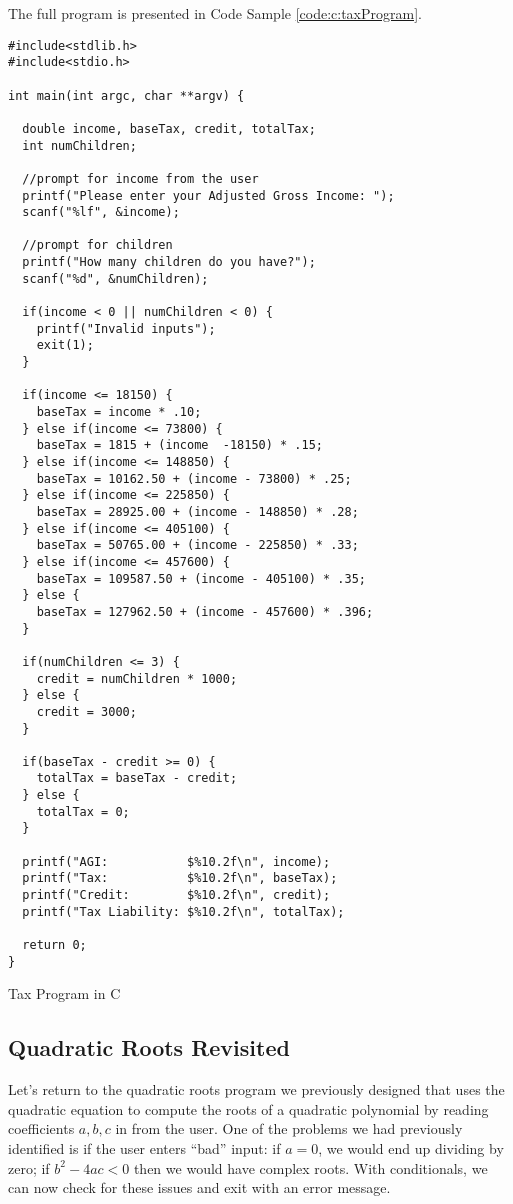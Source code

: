 The full program is presented in Code Sample \ref{code:c:taxProgram}.

\begin{listing}[h]
\begin{verbatim}
#include<stdlib.h>
#include<stdio.h>

int main(int argc, char **argv) {

  double income, baseTax, credit, totalTax;
  int numChildren;

  //prompt for income from the user
  printf("Please enter your Adjusted Gross Income: ");
  scanf("%lf", &income);

  //prompt for children
  printf("How many children do you have?");
  scanf("%d", &numChildren);

  if(income < 0 || numChildren < 0) {
    printf("Invalid inputs");
    exit(1);
  }

  if(income <= 18150) {
    baseTax = income * .10;
  } else if(income <= 73800) {
    baseTax = 1815 + (income  -18150) * .15;
  } else if(income <= 148850) {
    baseTax = 10162.50 + (income - 73800) * .25;
  } else if(income <= 225850) {
    baseTax = 28925.00 + (income - 148850) * .28;
  } else if(income <= 405100) {
    baseTax = 50765.00 + (income - 225850) * .33;
  } else if(income <= 457600) {
    baseTax = 109587.50 + (income - 405100) * .35;
  } else {
    baseTax = 127962.50 + (income - 457600) * .396;
  }

  if(numChildren <= 3) {
    credit = numChildren * 1000;
  } else {
    credit = 3000;
  }

  if(baseTax - credit >= 0) {
    totalTax = baseTax - credit;
  } else {
    totalTax = 0;
  }

  printf("AGI:           $%10.2f\n", income);
  printf("Tax:           $%10.2f\n", baseTax);
  printf("Credit:        $%10.2f\n", credit);
  printf("Tax Liability: $%10.2f\n", totalTax);

  return 0;
}
\end{verbatim}
\caption{Tax Program in C}
\label{code:c:taxProgram}
\end{listing}

\subsection{Quadratic Roots Revisited}

Let's return to the quadratic roots program we previously designed that uses
the quadratic equation to compute the roots of a quadratic polynomial by reading
coefficients $a, b, c$ in from the user.  One of the problems we had previously 
identified is if the user enters ``bad'' input: if $a = 0$, we would end up dividing
by zero; if $b^2-4ac < 0$ then we would have complex roots.  With conditionals, 
we can now check for these issues and exit with an error message.  


